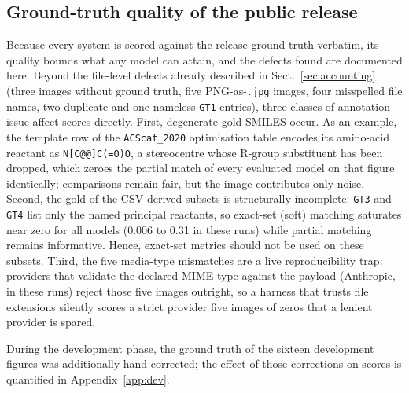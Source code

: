 \documentclass{article}
\begin{document}
\subsection{Ground-truth quality of the public release}
Because every system is scored against the release ground truth
verbatim, its quality bounds what any model can attain, and the defects
found are documented here. Beyond the file-level defects already
described in Sect.~\ref{sec:accounting} (three images without ground
truth, five PNG-as-\texttt{.jpg} images, four misspelled file names,
two duplicate and one nameless \texttt{GT1} entries), three classes of
annotation issue affect scores directly. First, degenerate gold SMILES
occur. As an example, the template row of the \texttt{ACScat\_2020}
optimisation table encodes its amino-acid reactant as
\texttt{N[C@@]C(=O)O}, a stereocentre whose R-group substituent has
been dropped, which zeroes the partial match of every evaluated model
on that figure identically; comparisons remain fair, but the image
contributes only noise. Second, the gold of the CSV-derived subsets is
structurally incomplete: \texttt{GT3} and \texttt{GT4} list only the
named principal reactants, so exact-set (soft) matching saturates near
zero for all models (0.006 to 0.31 in these runs) while partial
matching remains informative. Hence, exact-set metrics should not be
used on these subsets. Third, the five media-type mismatches are a
live reproducibility trap: providers that validate the declared MIME
type against the payload (Anthropic, in these runs) reject those five
images outright, so a harness that trusts file extensions silently
scores a strict provider five images of zeros that a lenient provider
is spared.

During the development phase, the ground truth of the sixteen
development figures was additionally hand-corrected; the effect of
those corrections on scores is quantified in Appendix~\ref{app:dev}.
\end{document}
